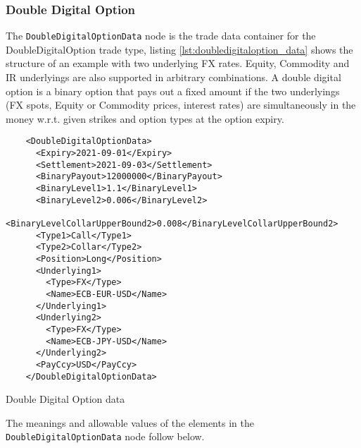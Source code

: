 \subsubsection{Double Digital Option}

The \verb+DoubleDigitalOptionData+ node is the trade data container for the DoubleDigitalOption trade type, listing
\ref{lst:doubledigitaloption_data} shows the structure of an example with two underlying FX rates. Equity, Commodity and IR underlyings are also supported in arbitrary combinations. 
A double digital option is a binary option that pays out a fixed amount if the two underlyings (FX spots, Equity or Commodity prices, interest rates) are simultaneously in the money w.r.t. given strikes and option types at the option expiry.

\begin{listing}[H]
\begin{verbatim}
    <DoubleDigitalOptionData>
      <Expiry>2021-09-01</Expiry>
      <Settlement>2021-09-03</Settlement>
      <BinaryPayout>12000000</BinaryPayout>
      <BinaryLevel1>1.1</BinaryLevel1>
      <BinaryLevel2>0.006</BinaryLevel2>
      <BinaryLevelCollarUpperBound2>0.008</BinaryLevelCollarUpperBound2>
      <Type1>Call</Type1>
      <Type2>Collar</Type2>
      <Position>Long</Position>
      <Underlying1>
        <Type>FX</Type>
        <Name>ECB-EUR-USD</Name>
      </Underlying1>
      <Underlying2>
        <Type>FX</Type>
        <Name>ECB-JPY-USD</Name>
      </Underlying2>
      <PayCcy>USD</PayCcy>
    </DoubleDigitalOptionData>
\end{verbatim}
\caption{Double Digital Option data}
\label{lst:doubledigitaloption_data}
\end{listing}

The meanings and allowable values of the elements in the \verb+DoubleDigitalOptionData+  node follow below.

